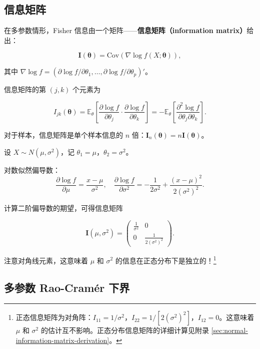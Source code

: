 \subsection{信息矩阵}

在多参数情形，Fisher 信息由一个矩阵——\textbf{信息矩阵（information matrix）}给出：

\[
\mathbf{I}(\boldsymbol{\theta}) = \text{Cov}\left( \nabla \log f(X; \boldsymbol{\theta}) \right),
\label{eq:information-matrix}
\]

其中 $\nabla \log f = (\partial \log f/\partial \theta_1, \ldots, \partial \log f/\partial \theta_p)'$。

信息矩阵的第 $(j,k)$ 个元素为

\[
I_{jk}(\boldsymbol{\theta}) = \mathbb{E}_\theta\left[ \frac{\partial \log f}{\partial \theta_j} \cdot \frac{\partial \log f}{\partial \theta_k} \right] = -\mathbb{E}_\theta\left[ \frac{\partial^2 \log f}{\partial \theta_j \partial \theta_k} \right].
\label{eq:information-matrix-elements}
\]

对于样本，信息矩阵是单个样本信息的 $n$ 倍：$\mathbf{I}_n(\boldsymbol{\theta}) = n\mathbf{I}(\boldsymbol{\theta})$。

\begin{example}[正态分布的信息矩阵]\label{ex:normal-information-matrix}
设 $X \sim N(\mu, \sigma^2)$，记 $\theta_1 = \mu$，$\theta_2 = \sigma^2$。

对数似然偏导数：
\[
\frac{\partial \log f}{\partial \mu} = \frac{x-\mu}{\sigma^2}, \quad
\frac{\partial \log f}{\partial \sigma^2} = -\frac{1}{2\sigma^2} + \frac{(x-\mu)^2}{2(\sigma^2)^2}.
\]

计算二阶偏导数的期望，可得信息矩阵

\[
\mathbf{I}(\mu, \sigma^2) = \begin{pmatrix} \frac{1}{\sigma^2} & 0 \\ 0 & \frac{1}{2(\sigma^2)^2} \end{pmatrix}.
\label{eq:normal-information-matrix}
\]

注意对角线元素，这意味着 $\mu$ 和 $\sigma^2$ 的信息在正态分布下是独立的！\footnote{正态信息矩阵为对角阵：$I_{11} = 1/\sigma^2$，$I_{22} = 1/[2(\sigma^2)^2]$，$I_{12} = 0$。这意味着 $\mu$ 和 $\sigma^2$ 的估计互不影响。正态分布信息矩阵的详细计算见附录 \cref{sec:normal-information-matrix-derivation}。}
\end{example}

\subsection{多参数 Rao-Cramér 下界}

